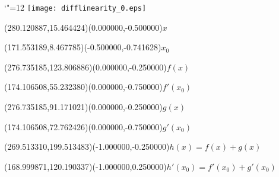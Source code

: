\documentclass[12pt]{article}
\begin{document}
\makeatletter%
\let\ASYencoding\f@encoding%
\let\ASYfamily\f@family%
\let\ASYseries\f@series%
\let\ASYshape\f@shape%
\makeatother%
{\catcode`"=12%
\texttt{[image: difflinearity\_0.eps]}%
}%
\kern -301.125000pt%
%
\fontsize{12.000000}{14.400000}\selectfont%
\usefont{\ASYencoding}{\ASYfamily}{\ASYseries}{\ASYshape}%
\ASYalign(280.120887,15.464424)(0.000000,-0.500000){$x$}%
%
\fontsize{12.000000}{14.400000}\selectfont%
\ASYalign(171.553189,8.467785)(-0.500000,-0.741628){$x_0$}%
%
\fontsize{12.000000}{14.400000}\selectfont%
\ASYalign(276.735185,123.806886)(0.000000,-0.250000){$f(x)$}%
%
\fontsize{12.000000}{14.400000}\selectfont%
\ASYalign(174.106508,55.232380)(0.000000,-0.750000){$f'(x_0)$}%
%
\fontsize{12.000000}{14.400000}\selectfont%
\ASYalign(276.735185,91.171021)(0.000000,-0.250000){$g(x)$}%
%
\fontsize{12.000000}{14.400000}\selectfont%
\ASYalign(174.106508,72.762426)(0.000000,-0.750000){$g'(x_0)$}%
%
\fontsize{12.000000}{14.400000}\selectfont%
\ASYalign(269.513310,199.513483)(-1.000000,-0.250000){$h(x)=f(x)+ g(x)$}%
%
\fontsize{12.000000}{14.400000}\selectfont%
\ASYalign(168.999871,120.190337)(-1.000000,0.250000){$h'(x_0)=f'(x_0)+ g'(x_0)$}%
\end{document}
